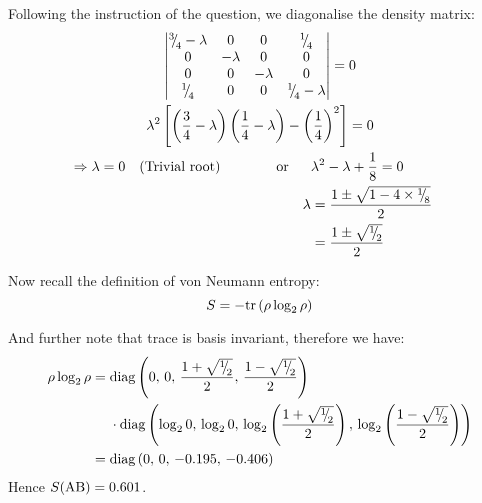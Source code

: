 \begin{parts}
	Following the instruction of the question, we diagonalise the density matrix:
	\begin{gather*}
		\begin{vmatrix}
			\diagfrac{3}{4}-\lambda & 0 & 0 & \diagfrac{1}{4} \\
			0 & -\lambda & 0 & 0 \\
			0 & 0 & -\lambda & 0 \\
			\diagfrac{1}{4} & 0 & 0 & \diagfrac{1}{4}-\lambda
		\end{vmatrix} = 0 \\
		\lambda^2 \sbracket{\rbracket{\frac{3}{4} - \lambda}\rbracket{\frac{1}{4} - \lambda} - \rbracket{\frac{1}{4}}^2} = 0 \\
		\begin{align*}
			\Rightarrow \lambda = 0 \textnormal{\hspace{1em}(Trivial root)} &
			\textnormal{\hspace{4em}or}&&\lambda^2 - \lambda + \frac{1}{8} = 0 && \\
			&&\lambda &= \frac{1 \pm \sqrt{1 - 4\times\diagfrac{1}{8}}}{2} && \\
			&& &= \frac{1 \pm \sqrt{\diagfrac{1}{2}}}{2} &&
		\end{align*}
	\end{gather*}
	
	Now recall the definition of von Neumann entropy:
	\begin{equation*}
		S = -\textnormal{tr}\left(\rho\log_2 \rho\right)
	\end{equation*}
	
	And further note that trace is basis invariant, therefore we have:
	\begin{align*}
		\rho\log_2 \rho &=
		\begin{aligned}[t]
			&\textnormal{diag}\left(0,\, 0,\, \frac{1+\sqrt{{{}^{1}{\mskip -5mu/\mskip -3mu}_{2}}}}{2},\, \frac{1-\sqrt{{{}^{1}{\mskip -5mu/\mskip -3mu}_{2}}}}{2}\right) \\
			&\cdot \textnormal{diag}\left(\log_2 0,\, \log_2 0,\, \log_2 \left(\frac{1+\sqrt{{{}^{1}{\mskip -5mu/\mskip -3mu}_{2}}}}{2}\right),\, \log_2 \left(\frac{1-\sqrt{{{}^{1}{\mskip -5mu/\mskip -3mu}_{2}}}}{2}\right)\right)
		\end{aligned} \\
		&= \textnormal{diag}\left(0,\, 0,\, -0.195,\, -0.406\right)
	\end{align*}
	Hence $S(\textnormal{AB}) = 0.601$.
	

\end{parts}
